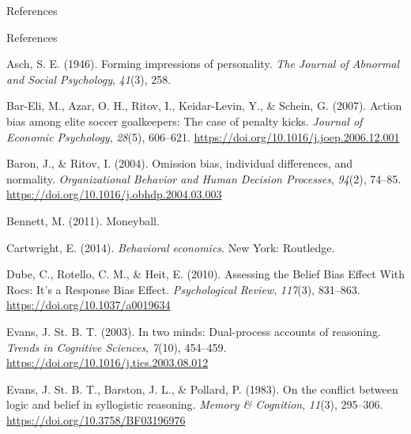 \documentclass[
  ignorenonframetext,
]{beamer}
\newlength{\cslhangindent}
\newlength{\cslentryspacingunit} %
\newenvironment{CSLReferences}[2] %
 {%
  \setlength{\parindent}{0pt}
  \ifodd #1
  \let\oldpar\par
  \def\par{\hangindent=\cslhangindent\oldpar}
  \fi
  \setlength{\parskip}{#2\cslentryspacingunit}
 }%
 {}
\begin{document}
\begin{frame}{References}
\protect\hypertarget{references-1}{}
\end{frame}

\begin{frame}{References}
\protect\hypertarget{references-2}{}
\noindent \vspace{-2em} \setlength{\parindent}{-0.5in}
\setlength{\leftskip}{0.5in} \setlength{\parskip}{7.5pt}

\hypertarget{refs}{}
\begin{CSLReferences}{1}{0}
\leavevmode{}%
Asch, S. E. (1946). Forming impressions of personality. \emph{The
Journal of Abnormal and Social Psychology}, \emph{41}(3), 258.

\leavevmode{}%
Bar-Eli, M., Azar, O. H., Ritov, I., Keidar-Levin, Y., \& Schein, G.
(2007). Action bias among elite soccer goalkeepers: {The} case of
penalty kicks. \emph{Journal of Economic Psychology}, \emph{28}(5),
606--621. \url{https://doi.org/10.1016/j.joep.2006.12.001}

\leavevmode{}%
Baron, J., \& Ritov, I. (2004). Omission bias, individual differences,
and normality. \emph{Organizational Behavior and Human Decision
Processes}, \emph{94}(2), 74--85.
\url{https://doi.org/10.1016/j.obhdp.2004.03.003}

\leavevmode{}%
Bennett, M. (2011). Moneyball.

\leavevmode{}%
Cartwright, E. (2014). \emph{Behavioral economics}. {New York}:
{Routledge}.

\leavevmode{}%
Dube, C., Rotello, C. M., \& Heit, E. (2010). Assessing the {Belief Bias
Effect With Rocs}: {It}'s a {Response Bias Effect}. \emph{Psychological
Review}, \emph{117}(3), 831--863. \url{https://doi.org/10.1037/a0019634}

\leavevmode{}%
Evans, J. St. B. T. (2003). In two minds: Dual-process accounts of
reasoning. \emph{Trends in Cognitive Sciences}, \emph{7}(10), 454--459.
\url{https://doi.org/10.1016/j.tics.2003.08.012}

\leavevmode{}%
Evans, J. St. B. T., Barston, J. L., \& Pollard, P. (1983). On the
conflict between logic and belief in syllogistic reasoning. \emph{Memory
\& Cognition}, \emph{11}(3), 295--306.
\url{https://doi.org/10.3758/BF03196976}


\end{CSLReferences}
\end{frame}
\end{document}
